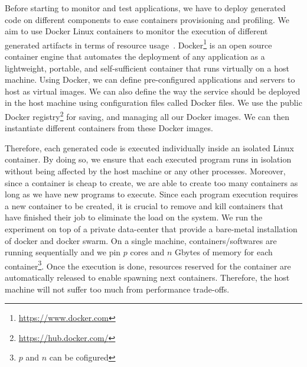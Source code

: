 

Before starting to monitor and test applications, we have to deploy generated code on different components to ease containers provisioning and profiling. 
We aim to use Docker Linux containers to monitor the execution of different generated artifacts in terms of resource usage~\cite{merkel2014docker}. 
Docker\footnote{\url{https://www.docker.com}} is an open source container engine that automates the deployment of any application as a lightweight, portable, and self-sufficient container that runs virtually on a host machine. 
Using Docker, we can define pre-configured applications and servers to host as virtual images. We can also define the way the service should be deployed in the host machine using configuration files called Docker files. 
We use the public Docker registry\footnote{\url{https://hub.docker.com/}} for  saving, and managing all our Docker images. 
We can then instantiate different containers from these Docker images. 

Therefore, each generated code is executed individually inside an isolated Linux container. By doing so, we ensure that each executed program runs in isolation without being affected by the host machine or any other processes. Moreover, since a container is cheap to create, we are able to create too many containers as long as we have new programs to execute.  
Since each program execution requires a new container to be created, it is crucial to remove and kill containers that have finished their job to eliminate the load on the system. We run the experiment on top of a private data-center that provide a bare-metal installation of  docker and docker swarm. On a single machine,  containers/softwares are running sequentially and we pin $p$ cores and $n$ Gbytes of memory for each container\footnote{$p$ and $n$ can be cofigured}. Once the execution is done, resources reserved for the container are automatically released to enable spawning next containers. Therefore, the host machine will not suffer too much from performance trade-offs.

